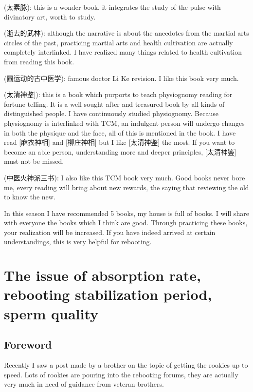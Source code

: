 \documentclass[
]{book}
\begin{document}
(太素脉): this is a wonder book, it integrates the study of the pulse with divinatory art, worth to study.

(逝去的武林): although the narrative is about the anecdotes from the martial arts circles of the past, practicing martial arts and health cultivation are actually completely interlinked. I have realized many things related to health cultivation from reading this book.

(圆运动的古中医学): famous doctor Li Ke revision. I like this book very much.

(太清神鉴{]}): this is a book which purports to teach physiognomy reading for fortune telling. It is a well sought after and treasured book by all kinds of distinguished people. I have continuously studied physiognomy. Because physiognomy is interlinked with TCM, an indulgent person will undergo changes in both the physique and the face, all of this is mentioned in the book. I have read {[}麻衣神相{]} and {[}柳庄神相{]} but I like {[}太清神鉴{]} the most. If you want to become an able person, understanding more and deeper principles, {[}太清神鉴{]} must not be missed.

(中医火神派三书): I also like this TCM book very much. Good books never bore me, every reading will bring about new rewards, the saying that reviewing the old to know the new.

In this season I have recommended 5 books, my house is full of books. I will share with everyone the books which I think are good. Through practicing these books, your realization will be increased. If you have indeed arrived at certain understandings, this is very helpful for rebooting.

\hypertarget{the-issue-of-absorption-rate-rebooting-stabilization-period-sperm-quality}{%
\chapter{The issue of absorption rate, rebooting stabilization period, sperm quality}\label{the-issue-of-absorption-rate-rebooting-stabilization-period-sperm-quality}}

\hypertarget{foreword-10}{%
\section{Foreword}\label{foreword-10}}

Recently I saw a post made by a brother on the topic of getting the rookies up to speed. Lots of rookies are pouring into the rebooting forums, they are actually very much in need of guidance from veteran brothers.
\end{document}
